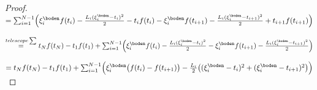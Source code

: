 \begin{thm}
\begin{proof}
  $= \sum_{i=1}^{N-1} \Bigl( \xi^\boden_{i} f(t_i) - \frac{L_i (\xi^\boden_{i}-t_i )^2}{2} - t_i f(t_i)   
  - \xi^\boden_{i} f(t_{i+1}) - \frac{L_i (\xi^\boden_{i} -t_{i+1})^2}{2}  + t_{i+1} f(t_{i+1}) \Bigr)$
  
    $\stackrel{telescope \sum}{=}  t_N f(t_N) - t_1 f(t_1)+\sum_{i=1}^{N-1} \Bigl(\xi^\boden_{i} f(t_i) - \frac{L_i (\xi^\boden_{i}-t_i )^2}{2}   
  - \xi^\boden_{i} f(t_{i+1}) - \frac{L_i (\xi^\boden_{i} -t_{i+1})^2}{2}  \Bigr) $
  
  $= t_N f(t_N) - t_1 f(t_1)+  \sum_{i=1}^{N-1} \Bigl(\xi^\boden_{i} \bigl( f(t_i) - f(t_{i+1})\bigr) - \frac{L_i}{2} \bigl( (\xi^\boden_{i}-t_i )^2 + (\xi^\boden_{i} -t_{i+1})^2 \bigr) 
 \Bigr)  $
 
% 
% 
% 
%
%
 


\end{proof}
\end{thm}
